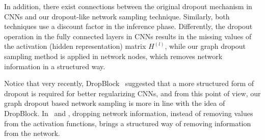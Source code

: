 {{In addition, there exist connections between the original dropout mechanism in CNNs and our dropout-like network sampling technique. 
Similarly, both techniques use a discount factor in the inference phase. 
Differently, the dropout operation in the fully connected layers in CNNs results in the missing values of the activation (hidden representation) matrix $H^{(l)}$, while our graph dropout sampling method is applied in network nodes, which removes network information in a structured way. 

Notice that very recently, DropBlock~\cite{ghiasi2018dropblock} suggested that a more structured form of dropout is required for better regularizing CNNs, and from this point of view, our graph dropout based network sampling is more in line with the idea of DropBlock. In \drop\ and \dm, dropping network information, instead of removing values from the activation functions, brings a structured way of removing information from the network. 
}






}







